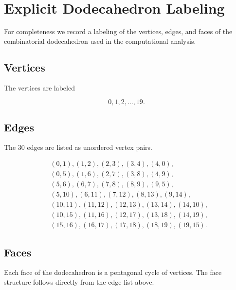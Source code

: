 \section{Explicit Dodecahedron Labeling}

For completeness we record a labeling of the vertices, edges, and
faces of the combinatorial dodecahedron used in the computational
analysis.

\subsection{Vertices}

The vertices are labeled

\[
0,1,2,\dots,19 .
\]

\subsection{Edges}

The $30$ edges are listed as unordered vertex pairs.

\begin{align*}
&(0,1),(1,2),(2,3),(3,4),(4,0),\\
&(0,5),(1,6),(2,7),(3,8),(4,9),\\
&(5,6),(6,7),(7,8),(8,9),(9,5),\\
&(5,10),(6,11),(7,12),(8,13),(9,14),\\
&(10,11),(11,12),(12,13),(13,14),(14,10),\\
&(10,15),(11,16),(12,17),(13,18),(14,19),\\
&(15,16),(16,17),(17,18),(18,19),(19,15).
\end{align*}

\subsection{Faces}

Each face of the dodecahedron is a pentagonal cycle of vertices.
The face structure follows directly from the edge list above.

